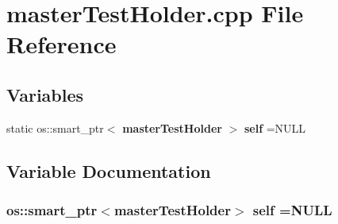 \section{master\+Test\+Holder.\+cpp File Reference}
\label{masterTestHolder_8cpp}
\subsection*{Variables}
\begin{DoxyCompactItemize}
\item 
static os\+::smart\+\_\+ptr$<$ {\bf master\+Test\+Holder} $>$ {\bf self} =N\+U\+LL
\end{DoxyCompactItemize}


\subsection{Variable Documentation}
\subsubsection[{self}]{\setlength{\rightskip}{0pt plus 5cm}os\+::smart\+\_\+ptr$<${\bf master\+Test\+Holder}$>$ self =N\+U\+LL\hspace{0.3cm}{\ttfamily [static]}}\label{masterTestHolder_8cpp_a02c8b1204c421842bd53c01e0564e3be}
